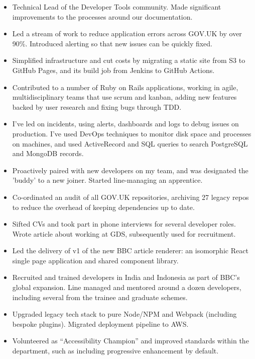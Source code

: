 \documentclass[10pt,a4paper,ragged2e,withhyper]{altacv}
\begin{document}
\begin{paracol}{2}
\begin{itemize}
    \item Technical Lead of the Developer Tools community. Made significant improvements to the processes around our documentation.
    \item Led a stream of work to reduce application errors across GOV.UK by over 90\%. Introduced alerting so that new issues can be quickly fixed.
    \item Simplified infrastructure and cut costs by migrating a static site from S3 to GitHub Pages, and its build job from Jenkins to GitHub Actions.
    \item Contributed to a number of Ruby on Rails applications, working in agile, multidisciplinary teams that use scrum and kanban, adding new features backed by user research and fixing bugs through TDD.
    \item I've led on incidents, using alerts, dashboards and logs to debug issues on production. I've used DevOps techniques to monitor disk space and processes on machines, and used ActiveRecord and SQL queries to search PostgreSQL and MongoDB records.
    \item Proactively paired with new developers on my team, and was designated the 'buddy' to a new joiner. Started line-managing an apprentice.
    \item Co-ordinated an audit of all GOV.UK repositories, archiving 27 legacy repos to reduce the overhead of keeping dependencies up to date.
    \item Sifted CVs and took part in phone interviews for several developer roles. Wrote article about working at GDS, subsequently used for recruitment.
\end{itemize}

\divider

\begin{itemize}
    \item Led the delivery of v1 of the new BBC article renderer: an isomorphic React single page application and shared component library.
\end{itemize}

\divider


\begin{itemize}
    \item Recruited and trained developers in India and Indonesia as part of BBC's global expansion. Line managed and mentored around a dozen developers, including several from the trainee and graduate schemes.
    \item Upgraded legacy tech stack to pure Node/NPM and Webpack (including bespoke plugins). Migrated deployment pipeline to AWS.
    \item Volunteered as ``Accessibility Champion'' and improved standards within the department, such as including progressive enhancement by default.
\end{itemize}


\end{paracol}
\end{document}

